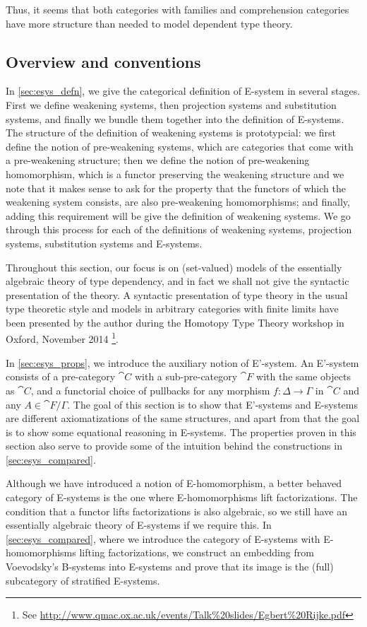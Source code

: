 Thus, it seems that both categories with families and comprehension categories
have more structure than needed to model dependent type theory.

\subsection*{Overview and conventions}
In \autoref{sec:esys_defn}, we give the categorical definition of E-system in 
several stages. First we define weakening systems, then projection systems and
substitution systems, and finally we bundle them together into the definition
of E-systems. The structure of the definition of weakening systems is 
prototypcial: we first define the notion of pre-weakening systems, which are
categories that come with a pre-weakening structure; then we define the notion
of pre-weakening homomorphism, which is a functor preserving the weakening
structure and we note that it makes sense to ask for the property that the
functors of which the weakening system consists, are also pre-weakening
homomorphisms; and finally, adding this requirement will be give the definition
of weakening systems. We go through this process for each of the definitions
of weakening systems, projection systems, substitution systems and E-systems.

Throughout this section, our focus is on (set-valued) models of the essentially algebraic
theory of type dependency, and in fact we shall not give the syntactic
presentation of the theory. A syntactic presentation of type theory in the
usual type theoretic style and models in arbitrary categories with finite limits
have been presented by the author during the Homotopy Type Theory workshop in
Oxford, November 2014%
\footnote{See \url{http://www.qmac.ox.ac.uk/events/Talk\%20slides/Egbert\%20Rijke.pdf}}.

In \autoref{sec:esys_props}, we introduce the auxiliary notion of E'-system.
An E'-system consists of a pre-category $\cat{C}$ with a sub-pre-category
$\cat{F}$ with the same objects as $\cat{C}$, and a functorial choice of
pullbacks for any morphism $f:\Delta\to\Gamma$ in $\cat{C}$ and any
$A\in\cat{F}/\Gamma$. The goal of this section is to show that 
E'-systems and E-systems are different axiomatizations of the same structures,
and apart from that the goal is to show some equational reasoning in E-systems.
The properties proven in this section also serve to provide some of the 
intuition behind the constructions in \autoref{sec:esys_compared}.

Although we have introduced a notion of E-homomorphism, a better behaved category
of E-systems is the one where E-homomorphisms lift factorizations. The condition
that a functor lifts factorizations is also algebraic, so we still have an
essentially algebraic theory of E-systems if we require this.
In \autoref{sec:esys_compared}, where we introduce the category of E-systems
with E-homomorphisms lifting factorizations, we construct an embedding from Voevodsky's
B-systems into E-systems and prove that its image is the (full) subcategory
of stratified E-systems. 


